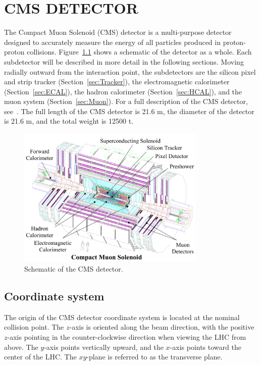 \chapter{CMS DETECTOR}
\label{chap:Detector}

The Compact Muon Solenoid (CMS) detector is a multi-purpose detector designed to accurately measure the energy of all particles produced in proton-proton collisions. Figure~\ref{fig:CMS}  shows a schematic of the detector as a whole. Each subdetector will be described in more detail in the following sections. Moving radially outward from the interaction point, the subdetectors are the silicon pixel and strip tracker (Section~\ref{sec:Tracker}), the electromagnetic calorimeter (Section~\ref{sec:ECAL}), the hadron calorimeter (Section~\ref{sec:HCAL}), and the muon system (Section~\ref{sec:Muon}). For a full description of the CMS detector, see~\cite{Chatrchyan2008zzk}. The full length of the CMS detector is 21.6 m, the diameter of the detector is 21.6 m, and the total weight is 12500 t.

\begin{figure}[h!]
	\centering
	\includegraphics[width=0.8\textwidth]{Figures/Detector/cms_labelled.pdf}
       \caption{Schematic of the CMS detector.
	}
   	\label{fig:CMS}
\end{figure}


\section{Coordinate system}
\label{sec:coordinates}
The origin of the CMS detector coordinate system is located at the nominal collision point. The $z$-axis is oriented along the beam direction, with the positive $z$-axis pointing in the counter-clockwise direction when viewing the LHC from above. The $y$-axis points vertically upward, and the $x$-axis points toward the center of the LHC. The $xy$-plane is referred to as the transverse plane.

